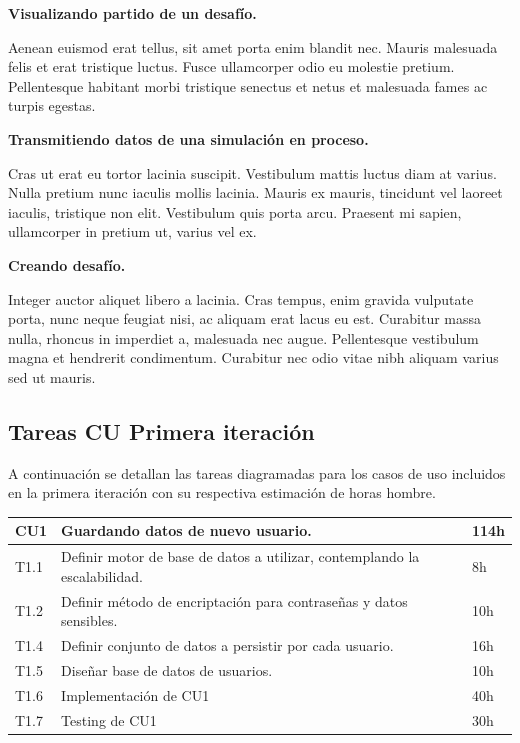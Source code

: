 \documentclass[a4paper, 10pt, twoside]{article}
\begin{document}
\textbf{Visualizando partido de un desafío.}

Aenean euismod erat tellus, sit amet porta enim blandit nec. Mauris malesuada felis et erat tristique luctus. Fusce ullamcorper odio eu molestie pretium. Pellentesque habitant morbi tristique senectus et netus et malesuada fames ac turpis egestas.


\textbf{Transmitiendo datos de una simulación en proceso.}

Cras ut erat eu tortor lacinia suscipit. Vestibulum mattis luctus diam at varius. Nulla pretium nunc iaculis mollis lacinia. Mauris ex mauris, tincidunt vel laoreet iaculis, tristique non elit. Vestibulum quis porta arcu. Praesent mi sapien, ullamcorper in pretium ut, varius vel ex.

\textbf{Creando desafío.}

Integer auctor aliquet libero a lacinia. Cras tempus, enim gravida vulputate porta, nunc neque feugiat nisi, ac aliquam erat lacus eu est. Curabitur massa nulla, rhoncus in imperdiet a, malesuada nec augue. Pellentesque vestibulum magna et hendrerit condimentum. Curabitur nec odio vitae nibh aliquam varius sed ut mauris.

\subsection{Tareas CU Primera iteración}
A continuación se detallan las tareas diagramadas para los casos de uso incluidos en la primera iteración con su respectiva estimación de horas hombre.
\\

\begin{tabular}{lp{13cm}l}
  \hline
  CU1 & Guardando datos de nuevo usuario. & 114h \\
  \hline
  T1.1 & Definir motor de base de datos a utilizar, contemplando la escalabilidad. & 8h \\
  T1.2 & Definir método de encriptación para contraseñas y datos sensibles. & 10h \\
  T1.4 & Definir conjunto de datos a persistir por cada usuario. & 16h \\
  T1.5 & Diseñar base de datos de usuarios. & 10h \\
  T1.6 & Implementación de CU1 & 40h\\
  T1.7 & Testing de CU1 & 30h\\
  \hline
\end{tabular}

\vspace{1em}
\end{document}
